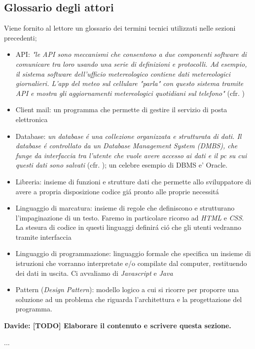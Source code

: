 \documentclass[12pt]{article}
\newcommand{\davide}[1]{{\bf \color{chromeyellow} Davide: #1 }}
\begin{document}
\subsection{Glossario degli attori}

Viene fornito al lettore un glossario dei termini tecnici utilizzati nelle sezioni precedenti;
\begin{itemize}
	\item API: \textit{"le API sono meccanismi che consentono a due componenti software di comunicare tra loro usando una serie di definizioni e protocolli. Ad esempio, il sistema software dell'ufficio metereologico contiene dati metereologici giornalieri. L'app del meteo sul cellulare "parla" con questo sistema tramite API e mostra gli aggiornamenti metereologici quotidiani sul telefono"} (cfr. \cite{bworld})
	\item Client mail: un programma che permette di gestire il servizio di posta elettronica 
	\item Database: \textit{un database \'e una collezione organizzata e strutturata di dati. Il database \'e controllato da un Database Management System (DMBS), che funge da interfaccia tra l'utente che vuole avere accesso ai dati e il pc su cui questi dati sono salvati} (cfr. \cite{database}); un celebre esempio di DBMS e' Oracle. 
	\item Libreria: insieme di funzioni e strutture dati che permette allo sviluppatore di avere a propria disposizione codice gi\'a pronto alle proprie necessit\'a
	\item Linguaggio di marcatura: insieme di regole che definiscono e strutturano l'impaginazione di un testo. Faremo in particolare ricorso ad \textit{HTML} e \textit{CSS}. La stesura di codice in questi linguaggi definir\'a ci\'o che gli utenti vedranno tramite interfaccia
	\item Linguaggio di programmazione: linguaggio formale che specifica un insieme di istruzioni che vorranno interpretate e/o compilate dal computer, restituendo dei dati in uscita. Ci avvaliamo di \textit{Javascript} e \textit{Java}
	\item Pattern (\textit{Design Pattern}): modello logico a cui si ricorre per proporre una soluzione ad un problema che riguarda l'architettura e la progettazione del programma. 
\end{itemize}

\davide{\textbf{[TODO]} Elaborare il contenuto e scrivere questa sezione.}

...
\end{document}
